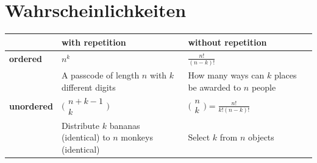 \documentclass[11pt]{article}
\begin{document}
\section{Wahrscheinlichkeiten}

\begin{table}[H]
\centering
\begin{tabular}{|p{2cm}|p{6cm}|p{6cm}|}
\hline
                   & \textbf{with repetition} & \textbf{without repetition} \\\hline
\textbf{ordered}   & $n^k$                         							 	  & $\frac{n!}{(n-k)!}$    \\\cline{2-3}
				   & A passcode of length $n$ with $k$ different digits           & How many ways can $k$ places be awarded to $n$ people                       \\\hline
\textbf{unordered} & $\bigl(\begin{smallmatrix}n+k-1\\k \end{smallmatrix} \bigr)$ & $\bigl(\begin{smallmatrix}n\\k \end{smallmatrix} \bigr) = \frac{n!}{k!(n-k)!}$ \\\cline{2-3}
				   & Distribute $k$ bananas (identical) to $n$ monkeys (identical)   & Select $k$ from $n$ objects                             \\\hline
\end{tabular}
\end{table}
\end{document}
